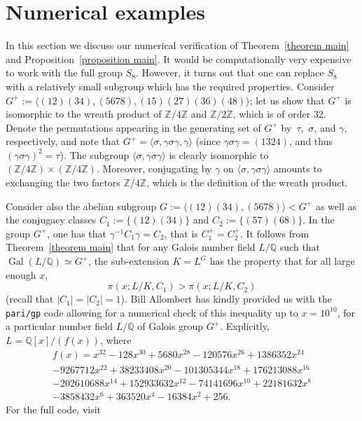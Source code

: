 \documentclass[JEP,XML,SOM,Unicode,NoEqCountersInSection,NoFloatCountersInSection,published]{cedram}
\theoremstyle{definition}
\DeclareMathOperator{\Gal}{Gal}
\newcommand{\Q}{\mathbb Q}
\newcommand{\Z}{\mathbb Z}
\begin{document}
\section{Numerical examples}\label{sec:numerics}

In this section we discuss our numerical verification of Theorem~\ref{theorem main} and Proposition~\ref{proposition main}. It would be computationally very expensive to work with the full group $S_8$. However, it turns out that one can replace $S_8$ with a relatively small subgroup which has the required properties.
Consider $G^+:=\langle (12)(34),(5678),(15)(27)(36)(48) \rangle $; let us show that $G^+$ is isomorphic to the wreath product of $\Z/4\Z$ and $\Z/2\Z$, which is of order $32$.
Denote the permutations appearing in the generating set of $G^+$ by~$\tau$,~$\sigma$, and $\gamma$, respectively, and note that
$G^+=\langle \sigma,\gamma\sigma\gamma,\gamma\rangle$
(since $\gamma\sigma\gamma=(1324)$, and thus $(\gamma\sigma\gamma)^2=\tau$).
The subgroup $\langle\sigma,\gamma\sigma\gamma\rangle$ is clearly isomorphic to $(\Z/4\Z)\times (\Z/4\Z)$.
Moreover, conjugating by $\gamma$ on $\langle\sigma,\gamma\sigma\gamma\rangle$ amounts to exchanging the two factors $\Z/4\Z$, which is the definition of the wreath product.

Consider also the abelian subgroup $G:= \langle (12)(34),(5678) \rangle <G^+ $ as well as the conjugacy classes $C_1:=\{(12)(34)\}$ and $C_2:=\{(57)(68)\}$.
In the group $G^+$, one has that $\gamma^{-1} C_1 \gamma =C_2$, that is $C_1^+=C_2^+$. It follows from Theorem~\ref{theorem main} that for any Galois number field $L/\Q$ such that $\Gal(L/\Q) \simeq G^+$, the sub-extension $K=L^{G}$ has the property that for all large enough $x$,
\[ \pi(x;L/K,C_1) >\pi(x;L/K,C_2)\](recall that $|C_1|=|C_2|=1$). Bill Allombert has kindly provided us with the {\tt pari/gp} code allowing for a numerical check of this inequality up to $x=10^{10}$, for a particular number field $L/\Q$ of Galois group $G^+$. Explicitly, $L=\Q[x]/(f(x))$, where
\begin{multline*}
f(x)=x^{32} - 128 x^{30} + 5680 x^{28} - 120576 x^{26} + 1386352 x^{24}\\
 - 9267712 x^{22} + 38233408 x^{20} - 101305344 x^{18} + 176213088 x^{16}\\
- 202610688 x^{14} + 152933632 x^{12}- 74141696 x^{10} + 22181632 x^8\\
- 3858432 x^6 + 363520 x^4 - 16384 x^2 + 256.
\end{multline*}
For the full code, visit
\end{document}
